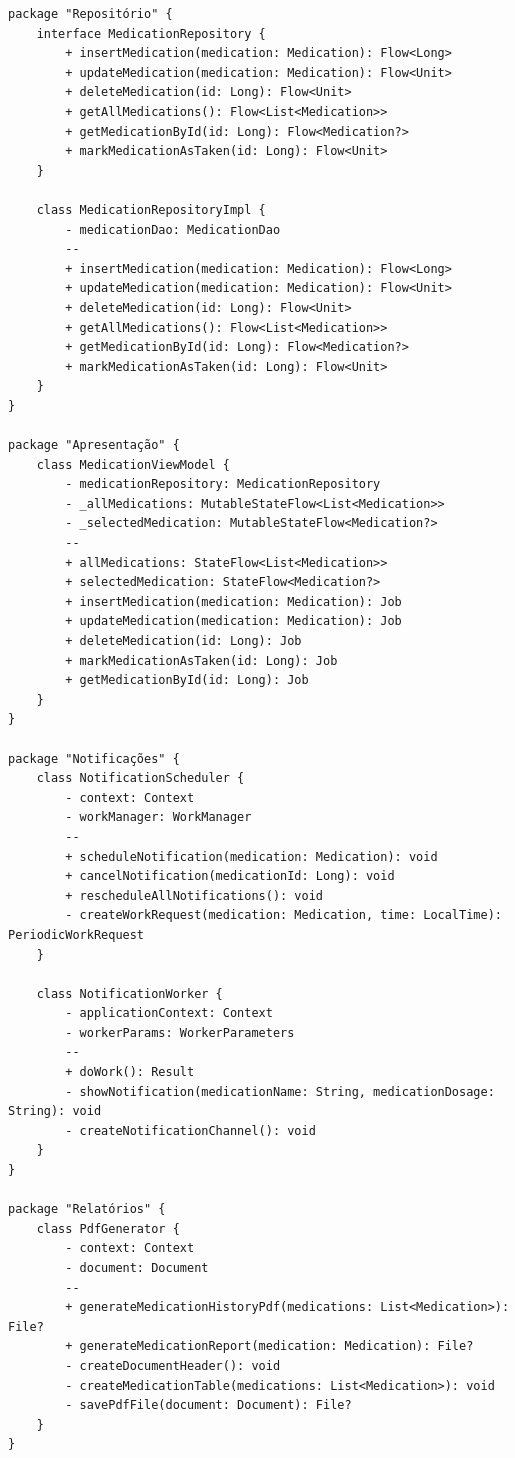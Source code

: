 \documentclass[12pt]{article}
\begin{document}
\begin{umlcodebox}
\begin{lstlisting}
package "Repositório" {
    interface MedicationRepository {
        + insertMedication(medication: Medication): Flow<Long>
        + updateMedication(medication: Medication): Flow<Unit>
        + deleteMedication(id: Long): Flow<Unit>
        + getAllMedications(): Flow<List<Medication>>
        + getMedicationById(id: Long): Flow<Medication?>
        + markMedicationAsTaken(id: Long): Flow<Unit>
    }
    
    class MedicationRepositoryImpl {
        - medicationDao: MedicationDao
        --
        + insertMedication(medication: Medication): Flow<Long>
        + updateMedication(medication: Medication): Flow<Unit>
        + deleteMedication(id: Long): Flow<Unit>
        + getAllMedications(): Flow<List<Medication>>
        + getMedicationById(id: Long): Flow<Medication?>
        + markMedicationAsTaken(id: Long): Flow<Unit>
    }
}

package "Apresentação" {
    class MedicationViewModel {
        - medicationRepository: MedicationRepository
        - _allMedications: MutableStateFlow<List<Medication>>
        - _selectedMedication: MutableStateFlow<Medication?>
        --
        + allMedications: StateFlow<List<Medication>>
        + selectedMedication: StateFlow<Medication?>
        + insertMedication(medication: Medication): Job
        + updateMedication(medication: Medication): Job
        + deleteMedication(id: Long): Job
        + markMedicationAsTaken(id: Long): Job
        + getMedicationById(id: Long): Job
    }
}

package "Notificações" {
    class NotificationScheduler {
        - context: Context
        - workManager: WorkManager
        --
        + scheduleNotification(medication: Medication): void
        + cancelNotification(medicationId: Long): void
        + rescheduleAllNotifications(): void
        - createWorkRequest(medication: Medication, time: LocalTime): PeriodicWorkRequest
    }
    
    class NotificationWorker {
        - applicationContext: Context
        - workerParams: WorkerParameters
        --
        + doWork(): Result
        - showNotification(medicationName: String, medicationDosage: String): void
        - createNotificationChannel(): void
    }
}

package "Relatórios" {
    class PdfGenerator {
        - context: Context
        - document: Document
        --
        + generateMedicationHistoryPdf(medications: List<Medication>): File?
        + generateMedicationReport(medication: Medication): File?
        - createDocumentHeader(): void
        - createMedicationTable(medications: List<Medication>): void
        - savePdfFile(document: Document): File?
    }
}


\end{lstlisting}
\end{umlcodebox}
\end{document}
